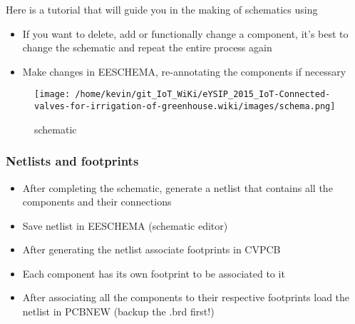\documentclass[16pt]{article}
\begin{document}
Here is a tutorial that will guide you in the making of schematics using

\begin{itemize}

\item
  If you want to delete, add or functionally change a component, it's
  best to change the schematic and repeat the entire process again
\item
  Make changes in EESCHEMA, re-annotating the components if necessary
  \vspace{0.2cm}
\end{itemize}


\begin{figure}

\texttt{[image: /home/kevin/git\_IoT\_WiKi/eYSIP\_2015\_IoT-Connected-valves-for-irrigation-of-greenhouse.wiki/images/schema.png]}
\caption{schematic}
\end{figure}
\vspace{0.4cm}



\subsubsection{Netlists and
footprints}


\begin{itemize}

\item
  After completing the schematic, generate a netlist that contains all
  the components and their connections
\item
  Save netlist in EESCHEMA (schematic editor)
\item
  After generating the netlist associate footprints in CVPCB
\item
  Each component has its own footprint to be associated to it
\item
  After associating all the components to their respective footprints
  load the netlist in PCBNEW (backup the .brd first!)
\end{itemize}



\end{document}
